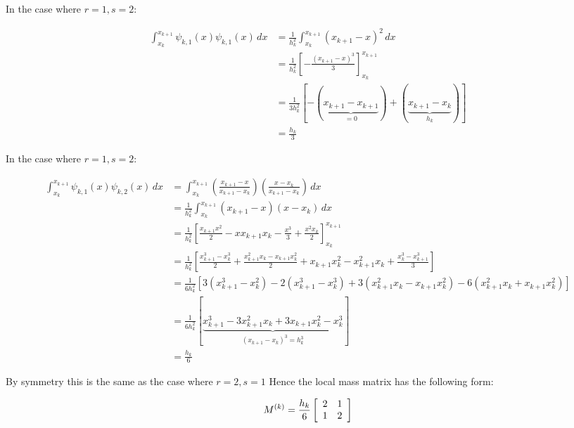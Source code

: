 In the case where $r = 1, s = 2$:

\begin{align*}
    \int_{x_k}^{x_{k+1}}\psi_{k,1}(x)\psi_{k,1}(x)\, dx
        &= \frac{1}{h_k^2}\int_{x_k}^{x_{k+1}}(x_{k+1} - x)^2\, dx \\
        &= \frac{1}{h_k^2}\left[-\frac{(x_{k+1} - x)^3}{3}\right]_{x_k}^{x_{k+1}} \\
        &= \frac{1}{3h_k^2}\left[- (\underbrace{x_{k+1} - x_{k+1}}_{=0}) +
                                 (\underbrace{x_{k+1} - x_k}_{h_k})\right] \\
        &= \frac{h_k}{3}
\end{align*}

In the case where $r = 1, s = 2$:

\begin{align*}
    \int_{x_k}^{x_{k+1}}\psi_{k,1}(x)\psi_{k,2}(x)\, dx &=
    \int_{x_k}^{x_{k+1}}\left(\frac{x_{k+1} - x}{x_{k+1} - x_k}\right)
                        \left(\frac{x - x_k}{x_{k+1} - x_k}\right)\, dx \\
    &= \frac{1}{h_k^2}\int_{x_k}^{x_{k+1}}(x_{k+1} - x)(x - x_k)\, dx \\
    &= \frac{1}{h_k^2}\left[\frac{x_{k+1}x^2}{2} - xx_{k+1}x_k
                            -\frac{x^3}{3} + \frac{x^2x_k}{2}\right]_{x_k}^{x_{k+1}} \\
    &= \frac{1}{h_k^2}\left[\frac{x_{k+1}^3 - x_k^3}{2} +
                            \frac{x_{k+1}^2x_k - x_{k+1}x_k^2}{2} +
                            x_{k+1}x_k^2 - x_{k+1}^2x_k +
                            \frac{x_k^3 - x_{k+1}^3}{3}\right] \\
    &= \frac{1}{6h_k^2}\left[3(x_{k+1}^3 - x_k^2) - 2(x_{k+1}^3 - x_k^3)
                           + 3(x_{k+1}^2x_k - x_{k+1}x_k^2) - 6(x_{k+1}^2x_k + x_{k+1}x_k^2)\right] \\
    &= \frac{1}{6h_k^2}
          [\underbrace{x_{k+1}^3 - 3x_{k+1}^2x_k + 3x_{k+1}x_k^2 - x_k^3}_{(x_{k+1} - x_k)^3 = h_k^3}] \\
    &= \frac{h_k}{6}
\end{align*}

By symmetry this is the same as the case where $r = 2, s = 1$ Hence the local
mass matrix has the following form:

\begin{equation}\label{eq:oned-deterministic-local-mass}
    M^{(k)} = \frac{h_k}{6}\left[\begin{array}{c c}
                2 & 1 \\ 1 & 2
              \end{array}\right]
\end{equation}

